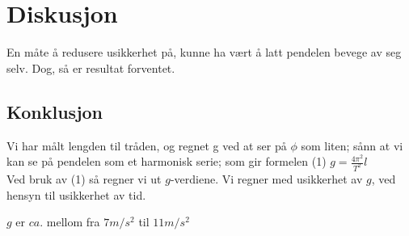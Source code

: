 \documentclass[a4paper]{article}
\begin{document}
\section{Diskusjon} %
\label{sec:diskusjon}
En måte å redusere usikkerhet på, kunne ha vært å latt pendelen bevege av seg selv. Dog, så er resultat forventet. 
\subsection{Konklusjon} %
\label{sub:konklusjon}
Vi har målt lengden til tråden, og regnet g ved at ser på $\phi$ som liten; sånn at vi kan se på pendelen som et harmonisk serie; som gir formelen (1) $g = \frac{4\pi^2}{T^2} l$ \\
Ved bruk av (1) så regner vi ut $g$-verdiene. Vi regner med usikkerhet av $g$, ved hensyn til usikkerhet av tid. \\

\begin{center}
	$g$ er $ca.$ mellom fra $7 m/s^2$ til $11 m /s^2$
\end{center}
\end{document}
